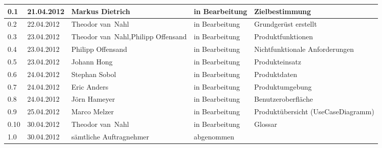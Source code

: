 \begin{longtable}{|m{1.78cm}|m{1.59cm}|m{2.86cm}|m{1.9cm}|m{5.25cm}|}
  0.1   &   21.04.2012     &   Markus Dietrich       &   in Bearbeitung    &  Zielbestimmung    \\       %
  \hline                                              %
  0.2   &   22.04.2012     &   Theodor van~Nahl   &   in Bearbeitung    &  Grundgerüst erstellt   \\       %
  \hline                                              %
  0.3   &   23.04.2012     &   Theodor van~Nahl,\newline Philipp \mbox{Offensand}   &   in Bearbeitung    &  Produktfunktionen   \\       %
  \hline                                              %
  0.4   &   23.04.2012     &   Philipp \mbox{Offensand}   &   in Bearbeitung    &  Nichtfunktionale Anforderungen   \\       %
  \hline                                              %
  0.5   &   23.04.2012     &   Johann Hong           &   in Bearbeitung    &  Produkteinsatz   \\       %
  \hline                                              %
  0.6   &   24.04.2012     &   Stephan Sobol         &   in Bearbeitung    &  Produktdaten  \\       %
  \hline                                              %
  0.7   &   24.04.2012     &   Eric Anders           &   in Bearbeitung    &  Produktumgebung   \\       %
  \hline                                              %
  0.8   &   24.04.2012     &   Jörn Hameyer          &   in Bearbeitung    &  Benutzeroberfläche   \\       %
  \hline                                              %
  0.9   &   25.04.2012     &   Marco Melzer           &   in Bearbeitung    &  Produktübersicht (UseCaseDiagramm)   \\       %
  \hline                                              %
  0.10 &   30.04.2012     &   Theodor van~Nahl   &   in Bearbeitung    &  Glossar   \\       %
  \hline                                              %
  1.0   &   30.04.2012     &   sämtliche Auftragnehmer   &   abgenommen    &     \\       %
  \hline                                              %
\end{longtable}


